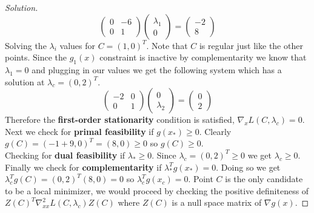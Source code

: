 \documentclass[12pt]{article}
\makeatletter
\theoremstyle{homework}
\newenvironment{exercise}[1]
{\def\@currentlabel{#1}\exercisecore}
{\endexercisecore}
\makeatother
\begin{document}
\begin{exercise}{P22}
\begin{enumerate}
\begin{proof}[Solution]
      \begin{equation*}
        \begin{pmatrix}
          0& -6\\
          0& 1
        \end{pmatrix}
        \begin{pmatrix}
          \lambda_1\\
          0
         \end{pmatrix}
          = 
          \begin{pmatrix}
            -2\\
            8
           \end{pmatrix}
      \end{equation*}
      Solving the $\lambda_i$ values for $C = (1, 0)^T$. Note that $C$ is regular just like the other points. Since the $g_1(x)$ constraint is inactive by complementarity we know that 
      $\lambda_1 = 0$ and plugging in our values we get the following system which has a solution at $\lambda_c = (0, 2)^T$. 
      \begin{equation*}
        \begin{pmatrix}
          -2& 0\\
          0& 1
        \end{pmatrix}
        \begin{pmatrix}
          0\\
          \lambda_2
         \end{pmatrix}
          = 
          \begin{pmatrix}
            0\\
            2
           \end{pmatrix}
      \end{equation*}
      Therefore the \textbf{first-order stationarity} condition is satisfied, $\nabla_x L(C, \lambda_c) = 0$.\\


      Next we check for \textbf{primal feasibility} if $g(x_*) \geq 0$. Clearly $g(C) = (-1 + 9, 0)^T = (8, 0) \geq 0$ so $g(C) \geq 0$. \\


      Checking for \textbf{dual feasibility} if $\lambda_* \geq 0$. Since $\lambda_c = (0, 2)^T \geq 0$ we get $\lambda_c \geq 0$.\\


      Finally we check for \textbf{complementarity} if $\lambda_*^Tg(x_*) = 0$. Doing so we get $\lambda_c^Tg(C) = (0, 2)^T(8, 0) = 0$ so 
      $\lambda_c^Tg(x_c) = 0$. Point $C$ is the only candidate to be a local minimizer, we would proceed by checking the positive definiteness of 
      $Z(C)^T \nabla^2_{xx}L(C, \lambda_c) Z(C)$ where $Z(C)$ is a null space matrix of $\nabla g(x)$.   
    \end{proof}
  \end{enumerate}

\end{exercise}
\vspace{.5in}
\end{document}
